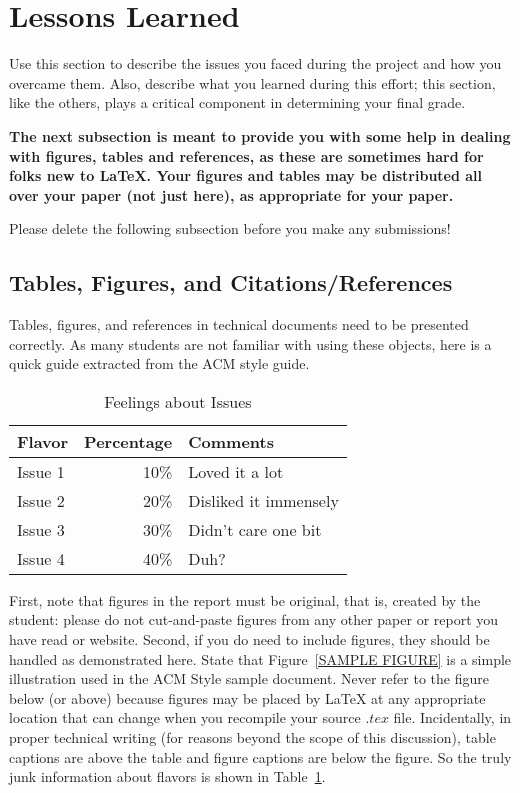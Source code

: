 \documentclass[12pt]{article}
\begin{document}
\section{Lessons Learned}
Use this section to describe the issues you faced during the project and how you overcame them. Also, describe what you learned during this effort; this section, like the others, plays a critical component in determining your final grade.\\

{\bf The next subsection is meant to provide you with some help in
  dealing with figures, tables and references, as these are sometimes
  hard for folks new to \LaTeX. Your figures and tables
  may be distributed all over your paper (not just here), as appropriate for your paper.

  Please delete the following subsection before you make any submissions!}

\subsection{Tables, Figures, and Citations/References}

Tables, figures, and references in technical
documents need to be presented correctly. As many students
are not familiar with using these objects, here is a quick
guide extracted from the ACM style guide.

\begin{table}
\centering
\caption{Feelings about Issues}
\label{SAMPLE TABLE}
\begin{tabular}{|l|r|l|} \hline
Flavor&Percentage&Comments\\ \hline
Issue 1 &  10\% & Loved it a lot\\ \hline
Issue 2 &  20\% & Disliked it immensely\\ \hline
Issue 3 &  30\% & Didn't care one bit\\ \hline
Issue 4 &  40\% & Duh?\\ \hline
\end{tabular}
\end{table}


First, note that figures in the report must be original, that is,
created by the student: please do not cut-and-paste figures from any
other paper or report you have read or website. Second, if you do need to include figures,
they should be handled as demonstrated here. State that
Figure~\ref{SAMPLE FIGURE} is a simple illustration used in the ACM
Style sample document. Never refer to the figure below (or above)
because figures may be placed by \LaTeX{} at any appropriate location
that can change when you recompile your source $.tex$
file. Incidentally, in proper technical writing (for reasons beyond
the scope of this discussion), table captions are above the table and
figure captions are below the figure. So the truly junk information
about flavors is shown in Table~\ref{SAMPLE TABLE}.
\end{document}

